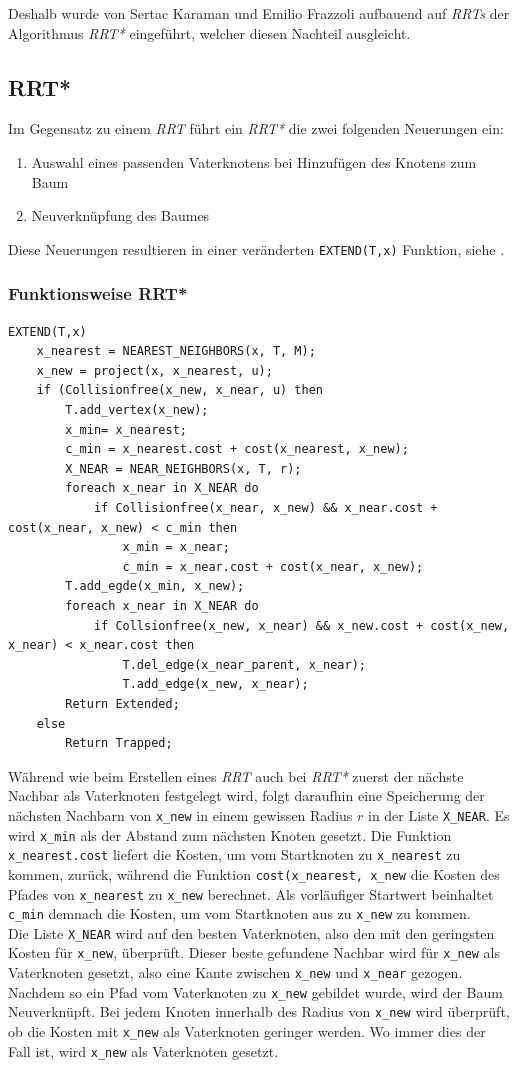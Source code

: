 Deshalb wurde von Sertac Karaman und Emilio Frazzoli aufbauend auf \textit{RRTs} der Algorithmus\textit{ RRT*} eingeführt, welcher diesen Nachteil ausgleicht.
\subsection{RRT*}
\label{RRT*}
Im Gegensatz zu einem \textit{RRT} führt ein \textit{RRT*} die zwei folgenden Neuerungen ein:
\begin{enumerate}
\item Auswahl eines passenden Vaterknotens bei Hinzufügen des Knotens zum Baum
\item Neuverknüpfung des Baumes
\end{enumerate}

Diese Neuerungen resultieren in einer veränderten \verb|EXTEND(T,x)| Funktion, siehe \citep{KaFra10}.
\subsubsection{Funktionsweise RRT*}
\begin{lstlisting}
EXTEND(T,x)
	x_nearest = NEAREST_NEIGHBORS(x, T, M);
	x_new = project(x, x_nearest, u);
	if (Collisionfree(x_new, x_near, u) then
		T.add_vertex(x_new);
		x_min= x_nearest;
		c_min = x_nearest.cost + cost(x_nearest, x_new);
		X_NEAR = NEAR_NEIGHBORS(x, T, r);
		foreach x_near in X_NEAR do
			if Collisionfree(x_near, x_new) && x_near.cost + cost(x_near, x_new) < c_min then
				x_min = x_near;
				c_min = x_near.cost + cost(x_near, x_new);
		T.add_egde(x_min, x_new);
		foreach x_near in X_NEAR do
			if Collsionfree(x_new, x_near) && x_new.cost + cost(x_new, x_near) < x_near.cost then
				T.del_edge(x_near_parent, x_near);
				T.add_edge(x_new, x_near);
		Return Extended;
	else
		Return Trapped;
\end{lstlisting}

Während wie beim Erstellen eines \textit{RRT} auch bei \textit{RRT*} zuerst der nächste Nachbar als Vaterknoten festgelegt wird, folgt daraufhin eine Speicherung der nächsten Nachbarn von \verb|x_new| in einem gewissen Radius $r$ in der Liste \verb|X_NEAR|. 
Es wird \verb|x_min| als der Abstand zum nächsten Knoten gesetzt. Die Funktion \verb|x_nearest.cost| liefert die Kosten, um vom Startknoten zu \verb|x_nearest| zu kommen, zurück, während die Funktion \verb|cost(x_nearest, x_new| die Kosten des Pfades von \verb|x_nearest| zu \verb|x_new| berechnet. Als vorläufiger Startwert beinhaltet \verb|c_min| demnach die Kosten, um vom Startknoten aus zu \verb|x_new| zu kommen. \\
Die Liste \verb|X_NEAR| wird auf den besten Vaterknoten, also den mit den geringsten Kosten für \verb|x_new|, überprüft. Dieser beste gefundene Nachbar wird für \verb|x_new| als Vaterknoten gesetzt, also eine Kante zwischen \verb|x_new| und \verb|x_near| gezogen. \\
\label{sec:rewiring}
Nachdem so ein Pfad vom Vaterknoten zu \verb|x_new| gebildet wurde, wird der Baum Neuverknüpft. Bei jedem Knoten innerhalb des Radius von \verb|x_new| wird überprüft, ob die Kosten mit \verb|x_new| als Vaterknoten geringer werden. Wo immer dies der Fall ist, wird \verb|x_new| als Vaterknoten gesetzt.
